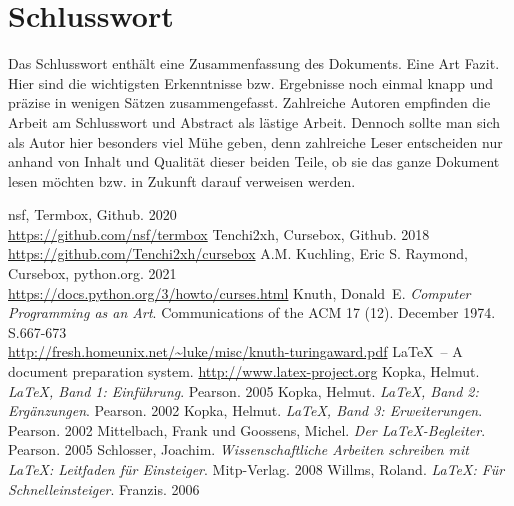 \documentclass{llncs}
\begin{document}
\section{Schlusswort}

Das Schlusswort enthält eine Zusammenfassung des Dokuments. Eine Art Fazit. Hier sind die wichtigsten Erkenntnisse bzw. Ergebnisse noch einmal knapp und präzise in wenigen Sätzen zusammengefasst. Zahlreiche Autoren empfinden die Arbeit am Schlusswort und Abstract als lästige Arbeit. Dennoch sollte man sich als Autor hier besonders viel Mühe geben, denn zahlreiche Leser entscheiden nur anhand von Inhalt und Qualität dieser beiden Teile, ob sie das ganze Dokument lesen möchten bzw. in Zukunft darauf verweisen werden.



\begin{thebibliography}{5}

\glqq nsf\grqq{}, Termbox, Github. 2020\\
\url{https://github.com/nsf/termbox}
\glqq Tenchi2xh\grqq{}, Cursebox, Github. 2018\\
\url{https://github.com/Tenchi2xh/cursebox}
A.M. Kuchling, Eric S. Raymond, Cursebox, python.org. 2021\\
\url{https://docs.python.org/3/howto/curses.html}
Knuth, Donald~E. \textsl{Computer Programming as an Art}. Communications of the ACM 17 (12). December 1974. S.667-673\\
\url{http://fresh.homeunix.net/~luke/misc/knuth-turingaward.pdf}
\LaTeX\ -- A document preparation system.
\url{http://www.latex-project.org}
Kopka, Helmut. \textsl{\LaTeX, Band 1: Einführung}. Pearson. 2005
Kopka, Helmut. \textsl{\LaTeX, Band 2: Ergänzungen}. Pearson. 2002
Kopka, Helmut. \textsl{\LaTeX, Band 3: Erweiterungen}. Pearson. 2002
Mittelbach, Frank und Goossens, Michel. \textsl{Der LaTeX-Begleiter}. Pearson. 2005
Schlosser, Joachim. \textsl{Wissenschaftliche Arbeiten schreiben mit LaTeX: Leitfaden für Einsteiger}. Mitp-Verlag. 2008
Willms, Roland. \textsl{\LaTeX: Für Schnelleinsteiger}. Franzis. 2006
\end{thebibliography}
\end{document}
